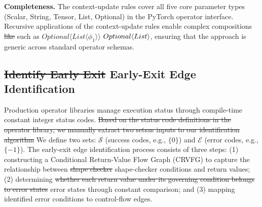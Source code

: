 \documentclass[manuscript,screen,review]{acmart}
\theoremstyle{indenteditalic}
\providecommand{\DIFaddtex}[1]{{\protect\color{blue}#1}} %
\providecommand{\DIFidentity}[1]{#1}
\providecommand{\DIFdeltex}[1]{{%
  \protect\color{red}%
  \normalfont\normalsize
  \let\textbf\DIFidentity
  \let\textit\DIFidentity
  \let\texttt\DIFidentity
  \let\textsc\DIFidentity
  \let\textsf\DIFidentity
  \let\emph\DIFidentity
  \let\uline\DIFidentity
  \sout{#1}%
}} %
\providecommand{\DIFaddbegin}{} %
\providecommand{\DIFaddend}{} %
\providecommand{\DIFdelbegin}{} %
\providecommand{\DIFdelend}{} %
\providecommand{\DIFadd}[1]{\texorpdfstring{\DIFaddtex{#1}}{#1}} %
\providecommand{\DIFdel}[1]{\texorpdfstring{\DIFdeltex{#1}}{}} %
\begin{document}
\noindent\textbf{Completeness.}
The \DIFaddbegin \DIFadd{context-update }\DIFaddend rules cover all five core parameter types (Scalar, String, Tensor, List, Optional) in the PyTorch operator interface.
Recursive \DIFaddbegin \DIFadd{applications of the context-update }\DIFaddend rules enable complex compositions \DIFdelbegin\DIFdel{like}\DIFdelend\DIFaddbegin\DIFadd{such as}\DIFaddend{} \DIFdelbegin \DIFdel{$\textsc{Optional}\langle\textsc{List}\langle\phi_1\rangle\rangle$}\DIFdelend \DIFaddbegin \DIFadd{$\textsc{Optional}\langle\textsc{List}\rangle$}\DIFaddend , ensuring \DIFaddbegin\DIFadd{that }\DIFaddend the approach is generic across standard operator schemas.


\DIFdelend \subsection{\DIFdelbegin \DIFdel{Identify Early Exit }\DIFdelend \DIFaddbegin \DIFadd{Early-Exit }\DIFaddend Edge \DIFaddbegin \DIFadd{Identification}\DIFaddend }\label{sec:design:early-return}

Production operator libraries manage execution status through compile-time constant integer status codes.
\DIFdelbegin \DIFdel{Based on the status code definitions in the operator library, we manually extract two setsas inputs to our identification algorithm}\DIFdelend \DIFaddbegin \DIFadd{We define two sets}\DIFaddend : $\mathcal{S}$ (success codes, e.g., $\{0\}$) and $\mathcal{E}$ (error codes, e.g., $\{-1\}$).
The early-exit edge identification process consists of three steps: (1) constructing a Conditional Return-Value Flow Graph (CRVFG) to capture the relationship between \DIFdelbegin \DIFdel{shape checker }\DIFdelend \DIFaddbegin \DIFadd{shape-checker }\DIFaddend conditions and return values; (2) determining \DIFdelbegin \DIFdel{whether each return value under its governing condition belongs to error states }\DIFdelend \DIFaddbegin \DIFadd{error states through constant comparison}\DIFaddend ; and (3) mapping identified error conditions to control-flow edges.
\end{document}
